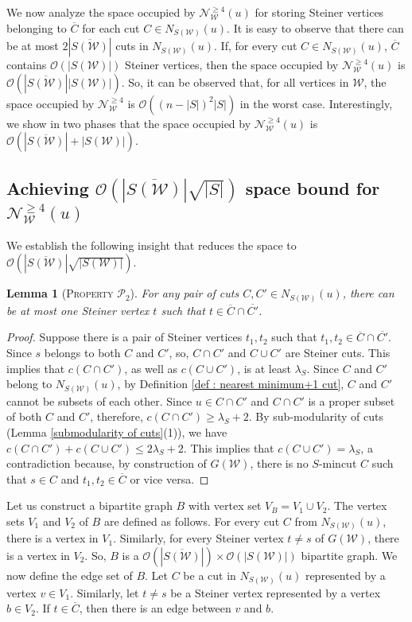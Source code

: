 \documentclass[letterpaper,11pt]{article}
\newtheorem{lemma}{Lemma}[]
\begin{document}
We now analyze the space occupied by ${\mathcal N}_{\mathcal W}^{\ge 4}(u)$ for storing Steiner vertices belonging to $\overline{C}$ for each cut $C\in N_{S({\mathcal W})}(u)$. It is easy to observe that there can be at most $2|\overline{S({\mathcal W})}|$ cuts in $N_{S({\mathcal W})}(u)$. If, for every cut $C\in N_{S({\mathcal W})}(u)$, $\overline{C}$ contains ${\mathcal O}(|S({\mathcal W})|)$ Steiner vertices, then the space occupied by ${\mathcal N}_{\mathcal W}^{\ge 4}(u)$ is ${\mathcal O}(|\overline{S({\mathcal W})}||S({\mathcal W})|)$. So, it can be observed that, for all vertices in ${\mathcal W}$, the space occupied by ${\mathcal N}_{\mathcal W}^{\ge 4}$ is ${\mathcal O}((n-|S|)^2|S|)$ in the worst case. 
Interestingly, we show in two phases that the space occupied by ${\mathcal N}_{\mathcal W}^{\ge 4}(u)$ is ${\mathcal O}(|\overline{S({\mathcal W})}|+|S({\mathcal W})|)$.
\subsection{Achieving ${\mathcal O}(|\overline{S({\mathcal W})}|\sqrt{|S|})$ space bound for ${\mathcal N}_{\mathcal W}^{\ge 4}(u)$} \label{app : root S bound} 
We establish the following insight that reduces the space to ${\mathcal O}(|\overline{S({\mathcal W})}|\sqrt{|S({\mathcal W})|})$. 
\begin{lemma} [\textsc{Property ${\mathcal P}_2$}] \label{lem : at most one bunch in common}
    For any pair of cuts $C,C'\in N_{S({\mathcal W})}(u)$, there can be at most one Steiner vertex $t$ such that $t\in \overline{C} \cap \overline{C'}$.
\end{lemma}
\begin{proof}
    Suppose there is a pair of Steiner vertices $t_1,t_2$ such that $t_1,t_2\in \overline{C}\cap \overline{C'}$. Since $s$ belongs to both $C$ and $C'$,  so, $C\cap C'$ and $C\cup C'$ are Steiner cuts. This implies that $c(C\cap C')$, as well as $c(C\cup C')$, is at least $\lambda_S$. Since $C$ and $C'$ belong to $N_{S({\mathcal W})}(u)$, by Definition \ref{def : nearest minimum+1 cut}, $C$ and $C'$ cannot be subsets of each other. Since $u\in C\cap C'$ and $C\cap C'$ is a proper subset of both $C$ and $C'$, therefore, $c(C\cap C')\ge \lambda_S+2$.  By sub-modularity of cuts (Lemma \ref{submodularity of cuts}(1)), we have $c(C\cap C')+c(C\cup C')\le 2\lambda_S+2$. This implies that $c(C\cup C')= \lambda_S$, a contradiction because, by construction of $G({\mathcal W})$, there is no $S$-mincut $C$ such that $s\in C$ and $t_1,t_2\in \overline{C}$ or vice versa.   
\end{proof}
Let us construct a bipartite graph $B$ with vertex set $V_B=V_1 \cup V_2$. The vertex sets $V_1$ and $V_2$ of $B$ are defined as follows. For every cut $C$ from $N_{S({\mathcal W})}(u)$, there is a vertex in $V_1$. Similarly, for every Steiner vertex $t\ne s$ of $G({\mathcal W})$, there is a vertex in $V_2$. So, $B$ is a ${\mathcal O}(|\overline{S({\mathcal W})}|) \times {\mathcal O}(|S({\mathcal W})|)$ bipartite graph. We now define the edge set of $B$. Let $C$ be a cut in $N_{S({\mathcal W})}(u)$ represented by a vertex $v\in V_1$. Similarly, let $t\ne s$ be a Steiner vertex represented by a vertex $b\in V_2$. If $t\in \overline{C}$, then there is an edge between $v$ and $b$.
\end{document}
